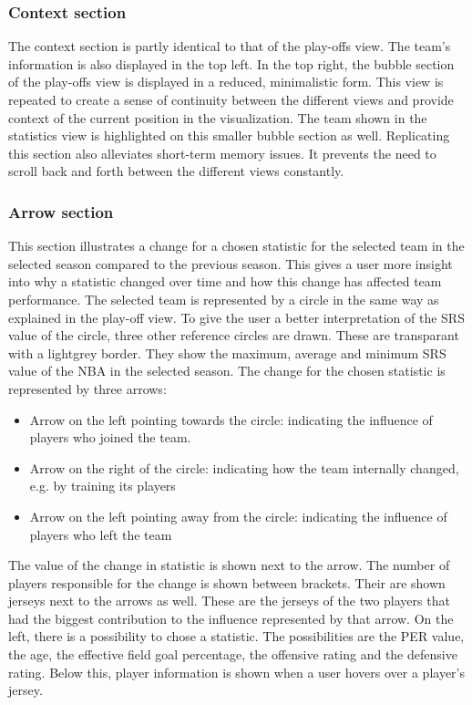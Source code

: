 \documentclass[chi_draft]{sigchi}
\begin{document}
\subsubsection{Context section}
The context section is partly identical to that of the play-offs view. The
team's information is also displayed in the top left. In the top right, the
bubble section of the play-offs view is displayed in a reduced, minimalistic
form. This view is repeated to create a sense of continuity between the
different views and provide context of the current position in the
visualization. The team shown in the statistics view is highlighted on this
smaller bubble section as well. Replicating this section also alleviates
short-term memory issues. It prevents the need to scroll back and forth between
the different views constantly. 

\subsubsection{Arrow section}
This section illustrates a change for a chosen statistic for the selected team in 
the selected season compared to the previous season. This gives a user more 
insight into why a statistic changed over time and how this change has affected 
team performance. The selected team is represented by a circle in the same way as 
explained in the play-off view. To give the user a better interpretation of the SRS 
value of the circle, three other reference circles are drawn. These are 
transparant with a lightgrey border. They show the maximum, average and minimum SRS 
value of the NBA in the selected season. The change for the chosen statistic is 
represented by three arrows:
\begin{itemize}
    \item Arrow on the left pointing towards the circle: indicating the
        influence of players who joined the team.
    \item Arrow on the right of the circle: indicating how the team internally
        changed, e.g. by training its players
    \item Arrow on the left pointing away from the circle: indicating the
        influence of players who left the team 
\end{itemize}
The value of the change in statistic is shown next to the arrow. The number of 
players responsible for the change is shown between brackets. Their are shown 
jerseys next to the arrows as well. These are the jerseys of the two players that 
had the biggest contribution to the influence represented by that arrow.  
On the left, there is a possibility to chose a statistic. The possibilities 
are the PER value, the age, the effective field goal percentage, the offensive rating 
and the defensive rating. Below this, player information is shown when a user hovers
over a player's jersey. 
\end{document}
